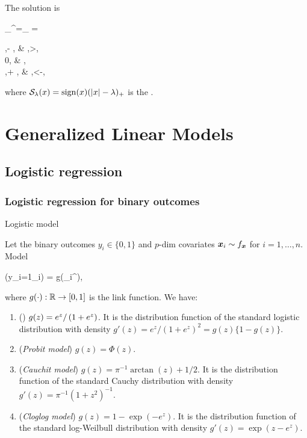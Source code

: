 \documentclass[10pt,a4paper]{book}
\begin{document}
The solution is 
\begin{sequation*}
	\hat{\beta}_{\lambda}^{\lasso}=\calS_{\lambda} =\begin{cases}
		 \langle \y,\x \rangle - \lambda, &  \langle \y,\x \rangle>\lambda, \\
		0, &  \abs{\langle \y,\x \rangle}\leq\lambda, \\
		\langle \y,\x \rangle + \lambda, &  \langle \y,\x \rangle<-\lambda,
	\end{cases}
\end{sequation*}
where ${\cal S}_{\lambda}(x)=\mathrm{sign}(x)(\left\lvert x\right\rvert-\lambda)_+$ is the .

\chapter{Generalized Linear Models}\label{chap:GLM}
\section{Logistic regression}\label{sec:logistic_reg}
\subsection{Logistic regression for binary outcomes}\label{sec:logistic_reg_binary}
\begin{defbox}{Logistic model}
	\begin{definition}\label{def:logistic_model}
		Let the binary outcomes $y_i\in\{0,1\}$ and $p$-dim covariates ${\boldsymbol x}_i\sim f_{\boldsymbol x}$ for $i=1,\ldots,n$. 
		Model 
		\begin{sequation*}
			\bbP(y_i=1\mid \x_i) = g(\x_i^\TT\bab),
		\end{sequation*}  
		where $g(\cdot):\mathbb R\to [0,1]$ is the link function. 
		We have:
		\begin{enumerate}
			\item () $g(z)={e^z}/\left( {1+e^z}\right)$. It is the distribution function of the standard logistic distribution with density $g'(z)=e^z/(1+e^z)^2=g(z)\{1-g(z)\}$. 
			\item ({\textit{Probit model}}) $g(z)=\Phi(z)$. 
			\item (\textit{Cauchit model}) $g(z)=\pi^{-1}\arctan(z)+1/2$. It is the distribution function of the standard Cauchy
			distribution with density $g'(z)=\pi^{-1}(1+z^2)^{-1}$. 
			\item (\textit{Cloglog model}) $g(z)=1-\exp(-e^{z})$. It is the distribution function of the standard log-Weilbull distribution with density $g'(z)=\exp(z-e^z)$. 
		\end{enumerate} 
	\end{definition}
\end{defbox}
\end{document}
